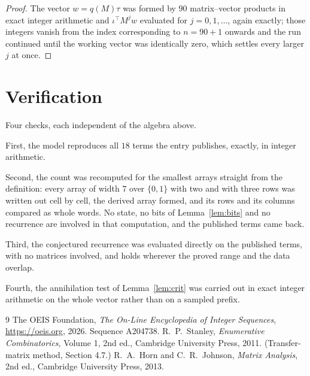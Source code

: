 \documentclass[11pt,a4paper]{article}
\theoremstyle{plain}
\theoremstyle{definition}
\begin{document}
\begin{proof}
The vector $w=q(M)\tau$ was formed by $90$ matrix--vector products in exact integer
arithmetic and $\iota^{\!\top}M^{j}w$ evaluated for $j=0,1,\dots$, again exactly; those
integers vanish from the index corresponding to $n=90+1$ onwards and the run continued
until the working vector was identically zero, which settles every larger $j$ at once.
\end{proof}

\section{Verification}

Four checks, each independent of the algebra above.

First, the model reproduces all $18$ terms the entry publishes, exactly, in integer
arithmetic.

Second, the count was recomputed for the smallest arrays straight from the definition: every
array of width $7$ over $\{0,1\}$ with two and with three rows was written out cell by cell,
the derived array formed, and its rows and its columns compared as whole words. No state, no
bits of Lemma~\ref{lem:bits} and no recurrence are involved in that computation, and the
published terms came back.

Third, the conjectured recurrence was evaluated directly on the published terms, with no
matrices involved, and holds wherever the proved range and the data overlap.

Fourth, the annihilation test of Lemma~\ref{lem:crit} was carried out in exact integer
arithmetic on the whole vector rather than on a sampled prefix.

\begin{thebibliography}{9}
 The OEIS Foundation, \emph{The On-Line Encyclopedia of Integer
Sequences}, \url{https://oeis.org}, 2026. Sequence A204738.
 R.~P.~Stanley, \emph{Enumerative Combinatorics}, Volume 1, 2nd ed.,
Cambridge University Press, 2011. (Transfer-matrix method, Section 4.7.)
 R.~A.~Horn and C.~R.~Johnson, \emph{Matrix Analysis}, 2nd ed., Cambridge
University Press, 2013.
\end{thebibliography}
\end{document}
